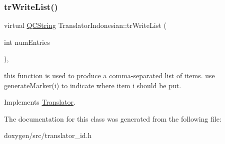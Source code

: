 \subsubsection{\texorpdfstring{trWriteList()}{trWriteList()}}
{\footnotesize\ttfamily virtual \mbox{\hyperlink{class_q_c_string}{Q\+C\+String}} Translator\+Indonesian\+::tr\+Write\+List (\begin{DoxyParamCaption}\item[{int}]{num\+Entries }\end{DoxyParamCaption})\hspace{0.3cm}{\ttfamily [inline]}, {\ttfamily [virtual]}}

this function is used to produce a comma-\/separated list of items. use generate\+Marker(i) to indicate where item i should be put. 

Implements \mbox{\hyperlink{class_translator}{Translator}}.



The documentation for this class was generated from the following file\+:\begin{DoxyCompactItemize}
\item 
doxygen/src/translator\+\_\+id.\+h\end{DoxyCompactItemize}
